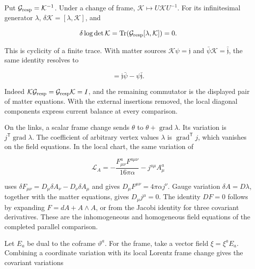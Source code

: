 \documentclass[aps,prx,onecolumn,10pt,notitlepage,nofootinbib,longbibliography]{revtex4-2}
\numberwithin{equation}{section}
\numberwithin{table}{section}
\begin{document}
Put $\mathcal G_{\rm resp}=\mathcal K^{-1}$. Under a change of frame, \({\mathcal K}\mapsto U{\mathcal K}U^{-1}\). For its infinitesimal generator \(\lambda\), \(\delta {\mathcal K}=[\lambda,{\mathcal K}]\), and

\begin{equation}
 \delta\log\det {\mathcal K}=\operatorname{Tr}({\mathcal G_{\rm resp}}[\lambda,{\mathcal K}])=0.
 \label{eq:proof-SF-1}
\end{equation}

This is cyclicity of a finite trace. With matter sources \({\mathcal K}\psi=\mathfrak j\) and \(\bar\psi {\mathcal K}=\bar{\mathfrak j}\), the same identity resolves to

\begin{equation}
 [{\mathcal K},{\mathcal G_{\rm resp}}+\psi\bar\psi]=\mathfrak j\bar\psi-\psi\bar{\mathfrak j}.
 \label{eq:proof-SF-2}
\end{equation}

Indeed \({\mathcal K}{\mathcal G_{\rm resp}}={\mathcal G_{\rm resp}}{\mathcal K}=I\), and the remaining commutator is the displayed pair of matter equations. With the external insertions removed, the local diagonal components express current balance at every comparison.

On the links, a scalar frame change sends \(\theta\) to \(\theta+\operatorname{grad}\lambda\). Its variation is \(j^{\mathsf T}\operatorname{grad}\lambda\). The coefficient of arbitrary vertex values \(\lambda\) is \(\operatorname{grad}^{\mathsf T}j\), which vanishes on the field equations. In the local chart, the same variation of

\begin{equation}
 \mathcal L_A=-\frac{F^a_{\mu\nu}F^{a\mu\nu}}{16\pi\alpha}
               -j^{a\mu}A^a_\mu
\end{equation}

uses \(\delta F_{\mu\nu}=D_\mu\delta A_\nu-D_\nu\delta A_\mu\) and gives \(D_\mu F^{\mu\nu}=4\pi\alpha j^\nu\). Gauge variation \(\delta A=D\lambda\), together with the matter equations, gives \(D_\mu j^\mu=0\). The identity \(DF=0\) follows by expanding \(F=dA+A\wedge A\), or from the Jacobi identity for three covariant derivatives. These are the inhomogeneous and homogeneous field equations of the completed parallel comparison.

Let $E_a$ be dual to the coframe $\vartheta^a$. For the frame, take a vector field \(\xi=\xi^aE_a\). Combining a coordinate variation with its local Lorentz frame change gives the covariant variations
\end{document}
